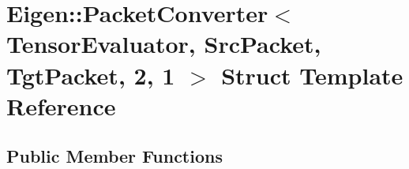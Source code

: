 \hypertarget{struct_eigen_1_1_packet_converter_3_01_tensor_evaluator_00_01_src_packet_00_01_tgt_packet_00_012_00_011_01_4}{}\section{Eigen\+:\+:Packet\+Converter$<$ Tensor\+Evaluator, Src\+Packet, Tgt\+Packet, 2, 1 $>$ Struct Template Reference}
\label{struct_eigen_1_1_packet_converter_3_01_tensor_evaluator_00_01_src_packet_00_01_tgt_packet_00_012_00_011_01_4}
\subsection*{Public Member Functions}
